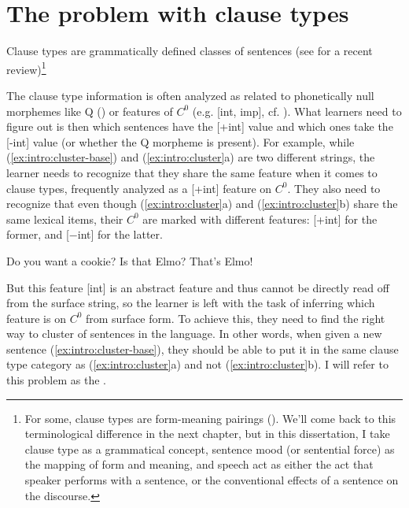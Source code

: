 \section{The problem with clause types}

Clause types are grammatically defined classes of sentences (see \cite{portner2018} for a recent review)\footnote{For some, clause types are form-meaning pairings (\cite{sz1985speechact, ginzburgsag2000interrogative}). We'll come back to this terminological difference in the next chapter, but in this dissertation, I take clause type as a grammatical concept, sentence mood (or sentential force) as the mapping of form and meaning, and speech act as either the act that speaker performs with a sentence, or the conventional effects of a sentence on the discourse.} 

The clause type information is often analyzed as related to  phonetically null morphemes like Q (\cite{katzpostal1964, baker1970int}) or features of $C^{0}$ (e.g. [\textpm int, \textpm imp], cf. \cite{langacker1974q, chomsky1995minimalist, rizzi1997, rizzi2001int, chomskylasnik1977, cheng1991,platzack1997imp,akmajian1984clausetype}). What learners need to figure out is then which sentences have the [+int] value and which ones take the [-int] value (or whether the Q morpheme is present). For example, while (\ref{ex:intro:cluster-base}) and (\ref{ex:intro:cluster}a) are two different strings, the learner needs to recognize that they share the same feature when it comes to clause types, frequently analyzed as a [+int] feature on $C^{0}$. They also need to recognize that even though (\ref{ex:intro:cluster}a) and (\ref{ex:intro:cluster}b) share the same lexical items, their $C^{0}$ are marked with different features: [+int] for the former, and [$-$int] for the latter.%




Do you want a cookie?
\eex
{}
\bxl{}
Is that Elmo?
\ex
That’s Elmo!
\exl
\eex


But this feature [\textpm int] is an abstract feature and thus cannot be directly read off from the surface string, so the learner is left with the task of inferring which feature is on $C^{0}$ from surface form. To achieve this, they need to find the right way to cluster of sentences in the language. In other words, when given a new sentence (\ref{ex:intro:cluster-base}), they should be able to put it in the same clause type category as (\ref{ex:intro:cluster}a) and not (\ref{ex:intro:cluster}b). I will refer to this problem as the . 

